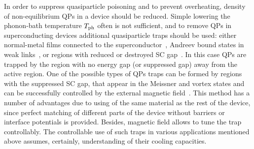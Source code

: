 \documentclass[prx,twocolumn,aps,superscriptaddress,showpacs,amsmath,amssymb,footnoteinbib]{revtex4-1}
\begin{document}
In order to suppress quasiparticle poisoning and to prevent
overheating, density of non-equilibrium QPs in a device should be
reduced. Simple lowering the phonon-bath temperature $T_{\rm ph}$
often is not sufficient, and to remove QPs in superconducting
devices additional quasiparticle traps should be used: either
normal-metal films connected to the superconductor~\cite{QP_traps1a,QP_traps1b,QP_traps1c}, Andreev bound states in
weak links~\cite{QP_traps_An}, or regions with reduced or
destroyed SC gap~\cite{QP_traps2a,QP_traps2b,QP_traps2c,QP_traps2d}. In this case
QPs are trapped by the region with no energy gap (or suppressed
gap) away from the active region. One of the possible types of QPs
traps can be formed by regions with the suppressed SC gap, that
appear in the Meissner and vortex states and can be successfully
controlled by the external magnetic field~\cite{QP_traps3a,QP_traps3b,QP_traps3c,QP_traps3d,QP_traps3e,QP_traps4a,Nakamura17,Taupin-Khaymovich-NatCom16,Catelani-Pekola_review21,Ueda21}.
This method has a number of advantages due to using of the same
material as the rest of the device, since perfect matching of
different parts of the device without barriers or interface
potentials is provided. Besides, magnetic field allows to tune the
trap controllably. The controllable use of such traps in various
applications mentioned above assumes, certainly, understanding of
their cooling capacities.
\end{document}
